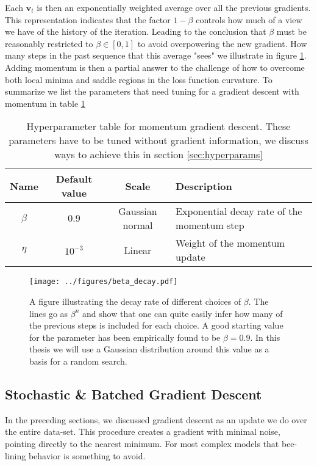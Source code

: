 \noindent Each $\mathbf{v}_t$ is then an exponentially weighted average over all the previous gradients. This representation indicates that the factor $1-\beta$ controls how much of a view we have of the history of the iteration. Leading to the conclusion that $\beta$ must be reasonably restricted to $\beta \in [0, 1]$ to avoid overpowering the new gradient. How many steps in the past sequence that this average "sees" we illustrate in figure \ref{fig:beta}. Adding momentum is then a partial answer to the challenge of how to overcome both local minima and saddle regions in the loss function curvature. To summarize we list the parameters that need tuning for a gradient descent with momentum in table \ref{tab:momentum}

\begin{table}
\centering
\caption{Hyperparameter table for momentum gradient descent. These parameters have to be tuned without gradient information, we discuss ways to achieve this in section \ref{sec:hyperparams}}\label{tab:momentum}
\begin{tabular}{cccl}
\toprule
Name &Default value & Scale  & Description\\
\midrule
$\beta$  & $0.9$ & Gaussian normal & Exponential decay rate of the momentum step\\
$\eta$  & $10^{-3}$ & Linear & Weight of the momentum update \\
\bottomrule
\end{tabular}
\end{table}


\begin{figure}
\centering
\texttt{[image: ../figures/beta\_decay.pdf]}
\caption[Exponential decay in momentum gradient descent]{A figure illustrating the decay rate of different choices of $\beta$. The lines go as $\beta^n$ and show that one can quite easily infer how many of the previous steps is included for each choice. A good starting value for the parameter has been empirically found to be $\beta=0.9$. In this thesis we will use a Gaussian distribution around this value as a basis for a random search.}\label{fig:beta}
\end{figure}

\subsection{Stochastic \& Batched Gradient Descent}
In the preceding sections, we discussed gradient descent as an update we do over the entire data-set. This procedure creates a gradient with minimal noise, pointing directly to the nearest minimum. For most complex models that bee-lining behavior is something to avoid. 

